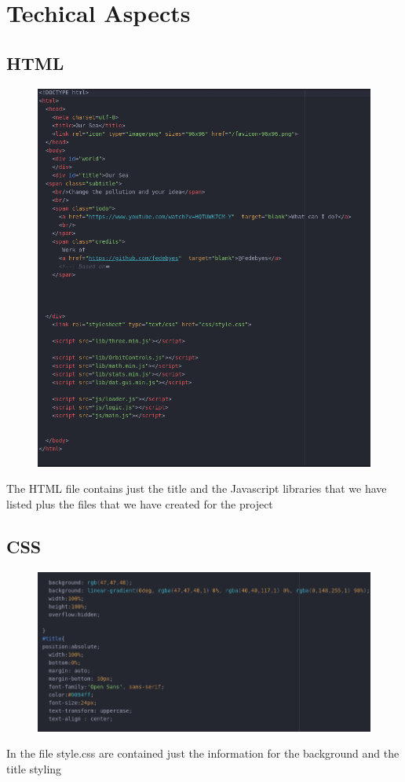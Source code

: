 \documentclass[a4paper,10pt]{article}
\begin{document}
\section{Techical Aspects}

\subsection{HTML}
\begin{figure}[H]
  \includegraphics[width=\linewidth]{Screenshot_20190226_185740.png}
\end{figure}



The HTML file contains just the title and the Javascript libraries that we have listed plus the files that we have created for the project




\subsection{CSS}
\begin{figure}[H]
  \includegraphics[width=\linewidth]{Screenshot_20190226_190022.png}
\end{figure}
In the file style.css are contained just the information for the background and the title styling
\end{document}
